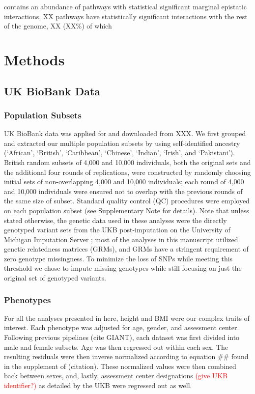 \documentclass[12pt,a4paper]{article}
\begin{document}
contains an abundance of pathways with statistical significant marginal epistatic interactions,  XX pathways have statistically significant interactions with the rest of the genome, XX (XX\%) of which




\section{Methods}\label{InterPath-Online-Methods}

\subsection{UK BioBank Data}

\subsubsection{Population Subsets}
UK BioBank data was applied for and downloaded from XXX. We first grouped and extracted our multiple population subsets by using self-identified ancestry (`African', `British', `Caribbean', `Chinese', `Indian', `Irish', and `Pakistani'). British random subsets of 4,000 and 10,000 individuals, both the original sets and the additional four rounds of replications, were constructed by randomly choosing initial sets of non-overlapping 4,000 and 10,000 individuals; each round of 4,000 and 10,000 individuals were ensured not to overlap with the previous rounds of the same size of subset. Standard quality control (QC) procedures were employed on each population subset (see Supplementary Note for details). Note that unless stated otherwise, the genetic data used in these analyses were the directly genotyped variant sets from the UKB post-imputation on the University of Michigan Imputation Server \citep{Das2016}; most of the analyses in this manuscript utilized genetic relatedness matrices (GRMs), and GRMs have a stringent requirement of zero genotype missingness. To minimize the loss of SNPs while meeting this threshold we chose to impute missing genotypes while still focusing on just the original set of genotyped variants.

\subsubsection{Phenotypes}

For all the analyses presented in here, height and BMI were our complex traits of interest. Each phenotype was adjusted for age, gender, and assessment center. Following previous pipelines (cite GIANT), each dataset was first divided into male and female subsets. Age was then regressed out within each sex. The resulting residuals were then inverse normalized according to equation \#\# found in the supplement of (citation). These normalized values were then combined back between sexes, and, lastly, assessment center designations \textcolor{red}{(give UKB identifier?)} as detailed by the UKB were regressed out as well. 
\end{document}
